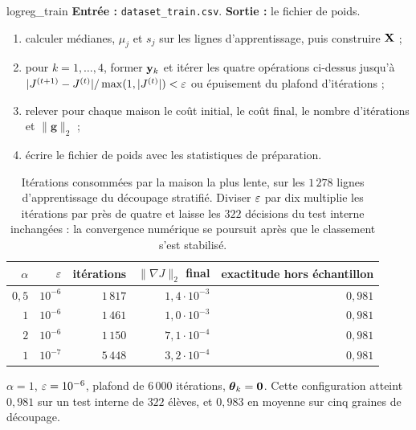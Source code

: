 \begin{procedure}{logreg\_train}
\textbf{Entrée :} \texttt{dataset\_train.csv}. \textbf{Sortie :} le fichier de
poids.
\begin{enumerate}
  \item calculer médianes, $\mu_j$ et $s_j$ sur les lignes d'apprentissage, puis
        construire $\mathbf{X}$ ;
  \item pour $k=1,\ldots,4$, former $\mathbf{y}_k$ et itérer les quatre opérations
        ci-dessus jusqu'à $|J^{(t+1)}-J^{(t)}|/\max(1,|J^{(t)}|)<\varepsilon$ ou
        épuisement du plafond d'itérations ;
  \item relever pour chaque maison le coût initial, le coût final, le nombre
        d'itérations et $\|\mathbf g\|_2$ ;
  \item écrire le fichier de poids avec les statistiques de préparation.
\end{enumerate}
\end{procedure}

\begin{table}[htbp]
\centering
\begin{tabular}{rrrrr}
\toprule
$\alpha$ & $\varepsilon$ & itérations & $\|\nabla J\|_2$ final & exactitude hors échantillon \\
\midrule
$0{,}5$ & $10^{-6}$ & $1\,817$ & $1{,}4\cdot10^{-3}$ & $0{,}981$ \\
$1$     & $10^{-6}$ & $1\,461$ & $1{,}0\cdot10^{-3}$ & $0{,}981$ \\
$2$     & $10^{-6}$ & $1\,150$ & $7{,}1\cdot10^{-4}$ & $0{,}981$ \\
$1$     & $10^{-7}$ & $5\,448$ & $3{,}2\cdot10^{-4}$ & $0{,}981$ \\
\bottomrule
\end{tabular}
\caption{Itérations consommées par la maison la plus lente, sur les $1\,278$
lignes d'apprentissage du découpage stratifié. Diviser $\varepsilon$ par dix multiplie
les itérations par près de quatre et laisse les $322$ décisions du test interne
inchangées : la convergence numérique se poursuit après que le classement s'est
stabilisé.}
\label{tab:training-defaults}
\end{table}

\begin{resultat}
$\alpha=1$, $\varepsilon=10^{-6}$, plafond de $6\,000$ itérations, $\boldsymbol{\theta}_k=\mathbf 0$.
Cette configuration atteint $0{,}981$ sur un test interne de $322$ élèves, et
$0{,}983$ en moyenne sur cinq graines de découpage.
\end{resultat}

